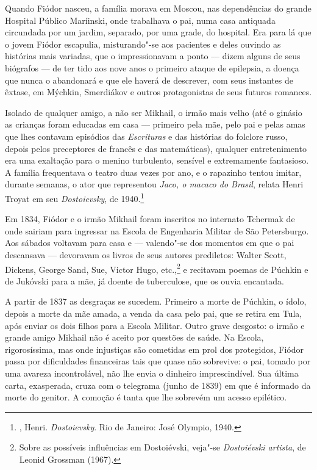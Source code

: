 Quando Fiódor nasceu, a família morava em Moscou, nas dependências
do grande Hospital Público Maríinski, onde trabalhava o pai, numa
casa antiquada circundada por um jardim, separado, por uma grade,
do hospital. Era para lá que o jovem Fiódor escapulia,
misturando"-se aos pacientes e deles ouvindo as histórias mais
variadas, que o impressionavam a ponto --- dizem alguns de seus
biógrafos --- de ter tido aos nove anos o primeiro ataque de
epilepsia, a doença que nunca o abandonará e que ele haverá
de descrever, com seus instantes de êxtase, em Mýchkin,
Smerdiákov e outros protagonistas de seus futuros romances.

Isolado de qualquer amigo, a não ser Mikhail, o irmão mais velho 
(até o ginásio as crianças foram educadas em casa --- primeiro
pela mãe, pelo pai e pelas amas que lhes contavam episódios das
\emph{Escrituras} e das histórias do folclore russo, depois pelos
preceptores de francês e das matemáticas), qualquer entretenimento
era uma exaltação para o menino turbulento, sensível e extremamente fantasioso. A família frequentava o teatro duas vezes por ano, e o rapazinho tentou imitar, durante semanas, o ator que representou \emph{Jaco, o
macaco do Brasil}, relata Henri Troyat em seu \emph{Dostoievsky},
de 1940.\footnote{, Henri. \emph{Dostoievsky}.
Rio de Janeiro: José Olympio, 1940.}

Em 1834, Fiódor e o irmão Mikhail foram inscritos no internato Tchermak
de onde sairiam para ingressar na Escola de Engenharia Militar
de São Petersburgo. Aos sábados voltavam para casa e --- valendo"-se dos momentos em que o pai descansava --- devoravam os livros de seus autores prediletos: Walter Scott, Dickens, George Sand, Sue, Victor Hugo, etc.,\footnote{Sobre as possíveis influências em Dostoiévski, veja"-se \emph{Dostoiévski artista}, de Leonid Grossman (1967).} e recitavam poemas de Púchkin e de Jukóvski para a mãe, já doente de tuberculose, que os ouvia encantada.

A partir de 1837 as desgraças se sucedem. Primeiro a morte de
Púchkin, o ídolo, depois a morte da mãe amada, a venda da casa
pelo pai, que se retira em Tula, após enviar os dois filhos para
a Escola Militar. Outro grave desgosto: o irmão e grande amigo
Mikhail não é aceito por questões de saúde. Na Escola,
rigorosíssima, mas onde injustiças são cometidas em prol dos
protegidos, Fiódor passa por dificuldades financeiras tais que
quase não sobrevive: o pai, tomado por uma avareza incontrolável,
não lhe envia o dinheiro imprescindível. Sua última carta,
exasperada, cruza com o telegrama (junho de 1839) em que é
informado da morte do genitor. A comoção é tanta que lhe
sobrevém um acesso epilético.

